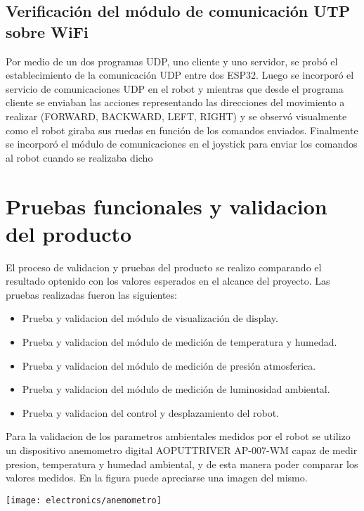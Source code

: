 \subsection{Verificación del módulo de comunicación UTP sobre WiFi}
Por medio de un dos programas UDP, uno cliente y uno servidor, se probó el establecimiento de la comunicación UDP entre dos ESP32. Luego se incorporó el servicio de comunicaciones UDP en el robot y mientras que desde el programa cliente se enviaban las acciones representando las direcciones del movimiento a realizar (FORWARD, BACKWARD, LEFT, RIGHT) y se observó visualmente como el robot giraba sus ruedas en función de los comandos enviados. Finalmente se incorporó el módulo de comunicaciones en el joystick para enviar los comandos al robot cuando se realizaba dicho


\section{Pruebas funcionales y validacion del producto}

El proceso de validacion y pruebas del producto se realizo comparando el resultado optenido con los valores esperados en el alcance del proyecto. Las pruebas realizadas fueron las siguientes:
\begin{itemize}
	\item Prueba y validacion del módulo de visualización de display.
	\item Prueba y validacion del módulo de medición de temperatura y humedad.
	\item Prueba y validacion del módulo de medición de presión atmosferica.
	\item Prueba y validacion del módulo de medición de luminosidad ambiental.
	\item Prueba y validacion del control y desplazamiento del robot.
\end{itemize}

Para la validacion de los parametros ambientales medidos por el robot se utilizo un dispositivo anemometro digital AOPUTTRIVER AP-007-WM capaz de medir presion, temperatura y humedad ambiental, y de esta manera poder comparar los valores medidos. En la figura puede apreciarse una imagen del mismo.

\begin{center}
 \texttt{[image: electronics/anemometro]}
   \label{fig:anemometro}
\end{center}

